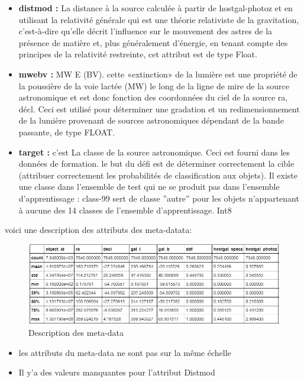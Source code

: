 \begin{itemize}
    \item \textbf{distmod :} La distance à la source calculée à partir de hostgal-photoz et en utilisant la relativité générale qui est une théorie relativiste de la gravitation, c’est-à-dire qu’elle décrit l’influence sur le mouvement des astres de la présence de matière et, plus généralement d’énergie, en tenant compte des principes de la relativité restreinte, cet attribut est de type Float.
    \item\textbf{mwebv :} MW E (BV). cette «extinction» de la lumière est une propriété de la poussière de la voie lactée (MW) le long de la ligne de mire de la source astronomique et est donc fonction des coordonnées du ciel de la source ra, décl. Ceci est utilisé pour déterminer une gradation et un redimensionnement de la lumière provenant de sources astronomiques dépendant de la bande passante, de type FLOAT.
    \item\textbf{target :} c’est La classe de la source astronomique. Ceci est fourni dans les données de formation. le but du défi est de déterminer correctement la cible (attribuer correctement les probabilités de classification aux objets). Il existe une classe dans l’ensemble de test qui ne se produit pas dans l’ensemble d’apprentissage : class-99 sert de classe ”autre” pour les objets n’appartenant à aucune des 14 classes de l’ensemble d’apprentissage. Int8
    \end{itemize}
voici une description des attributs des meta-datata: 

\begin{figure}[!h]
    \centering
    \includegraphics[width=16cm]{report/figures/explore.jpg}
    \caption{Description des meta-data}
    \label{fig:my_label}
\end{figure}

\begin{itemize}
    \item les attributs du meta-data ne sont pas sur la même échelle
    \item Il y'a des valeurs manquantes pour l'attribut Distmod
\end{itemize}


